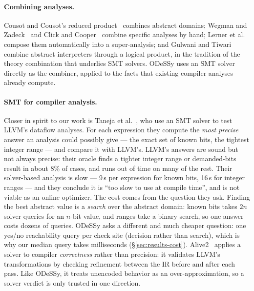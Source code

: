 \documentclass[acmsmall,screen,nonacm]{acmart}
\newcommand{\odessy}{ODeSSy}
\newcommand{\tool}{\odessy}
\newcommand{\pct}[1]{#1\%}
\begin{document}
\paragraph{Combining analyses.}
Cousot and Cousot's reduced product~\cite{cousot1979systematic} combines abstract domains; Wegman and Zadeck~\cite{wegman1991constant} and Click and Cooper~\cite{click1995combining} combine specific analyses by hand; Lerner et al.~\cite{lerner2002composing} compose them automatically into a super-analysis; and Gulwani and Tiwari~\cite{gulwani2006combining} combine abstract interpreters through a logical product, in the tradition of the theory combination that underlies SMT solvers. \tool{} uses an SMT solver directly as the combiner, applied to the facts that existing compiler analyses already compute.

\paragraph{SMT for compiler analysis.}
Closer in spirit to our work is Taneja et al.~\cite{taneja2020knownbits},
who use an SMT solver to test LLVM's dataflow analyses. For each expression they compute the
\emph{most precise} answer an analysis could possibly give --- the
exact set of known bits, the tightest integer range --- and compare it
with LLVM's. LLVM's answers are sound but not always precise: their oracle finds a tighter integer range or
demanded-bits result in about \pct{8} of cases, and runs out of time on many of the rest. Their solver-based analysis
is slow --- 9\,s per expression for known bits, 16\,s for integer
ranges --- and they conclude it is ``too slow to use at compile time'', and is not viable as an online optimizer.
The cost comes from the question they ask. Finding the best abstract
value is a \emph{search} over the abstract domain: known bits takes
$2n$ solver queries for an $n$-bit value, and ranges take a binary
search, so one answer costs dozens of queries. \tool{} asks a different
and much cheaper question: one yes/no reachability query per check
site (decision rather than search), which is why our median query
takes milliseconds (\S\ref{sec:results-cost}).
Alive2~\cite{lopes2021alive2} applies a solver to compiler
\emph{correctness} rather than precision: it validates LLVM's
transformations by checking refinement between the IR before and after
each pass. Like \tool{}, it treats unencoded behavior as an
over-approximation, so a solver verdict is only trusted in one
direction.
\end{document}
